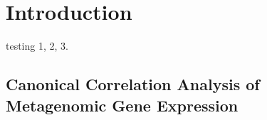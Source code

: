 
\section{Introduction}
testing 1, 2, 3.

\subsection{Canonical Correlation Analysis of Metagenomic Gene Expression}


